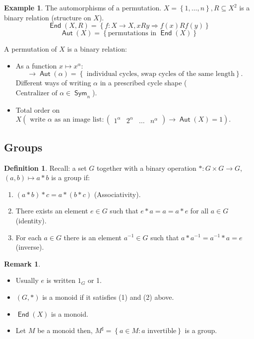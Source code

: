 \documentclass[12pt]{amsart}
\theoremstyle{definition}
\newtheorem{example}[theorem]{Example}
\newtheorem{definition}[theorem]{Definition}
\newtheorem{remark}[theorem]{Remark}
\DeclareMathOperator{\Aut}{\mathsf{Aut}}
\DeclareMathOperator{\End}{\mathsf{End}}
\DeclareMathOperator{\Sym}{\mathsf{Sym}}
\begin{document}
\begin{example}
The automorphisms of a permutation.
$X = \left\{ 1, \ldots, n \right\}, R \subseteq X^{2}$ is a binary relation (structure on $X$).
$$\End(X, R) = \left\{ f: X \rightarrow X, x R y \Rightarrow f(x) R f(y) \right\}$$
$$\Aut(X) = \left\{ \text{permutations in } \End(X) \right\}$$

A permutation of $X$ is a binary relation:
\begin{itemize}
\item As a function $x \mapsto x^{\alpha}$:
$$\rightarrow \Aut( \alpha ) = \left\{\text{ individual cycles, swap cycles of the same length} \right\}.$$
\noindent Different ways of writing $\alpha$ in a prescribed cycle shape ($ \text{Centralizer of } \alpha \in \Sym_{n}$).
\item Total order on $X \left( \text{ write $\alpha$ as an image list}: \begin{pmatrix}1^{\alpha} & 2^{\alpha} & \ldots & n^{\alpha} \end{pmatrix} \rightarrow \Aut(X) = 1 \right).$
\end{itemize}
\end{example}

\subsection{Groups}
\begin{definition}
Recall: a set $G$ together with a binary operation $\ast: G \times G \rightarrow G$, $\left( a, b \right) \mapsto a \ast b$ is a group if:
\begin{enumerate}
\item $\left( a \ast b \right) \ast c = a \ast \left( b \ast c \right)$ (Associativity).
\item There exists an element $e \in G$ such that $e \ast a = a = a \ast e$ for all $a \in G$ (identity).
\item For each $a \in G$ there is an element $a^{ - 1} \in G$ such that $a \ast a^{- 1} = a^{- 1} \ast a = e$ (inverse).
\end{enumerate}
\end{definition}

\begin{remark}
\begin{itemize}
\item Usually $e$ is written $1_{G}$ or 1.
\item $\left( G, \ast \right)$ is a monoid if it satisfies (1) and (2) above.
\item $\End(X)$ is a monoid.
\item Let $M$ be a monoid then, $M^{\sharp} = \left\{ a \in M : a \text{ invertible} \right\}$ is a group.
\end{itemize}
\end{remark}
\end{document}
